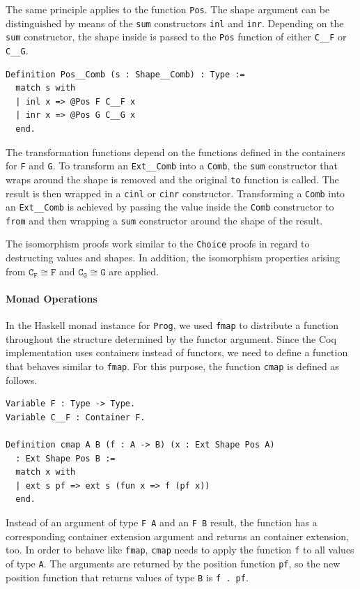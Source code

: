 \documentclass[a4paper, 11pt, fleqn, twoside]{scrreprt}
\newcommand{\hinl}[1]{\texttt{#1}}
\newcommand{\cinl}[1]{\texttt{#1}}
\begin{document}
The same principle applies to the function \cinl{Pos}.
The shape argument can be distinguished by means of the \cinl{sum} constructors \cinl{inl} and \cinl{inr}.
Depending on the \cinl{sum} constructor, the shape inside is passed to the \cinl{Pos} function of either \cinl{C__F} or \cinl{C__G}.

\begin{verbatim}
Definition Pos__Comb (s : Shape__Comb) : Type :=
  match s with
  | inl x => @Pos F C__F x
  | inr x => @Pos G C__G x
  end.
\end{verbatim}

The transformation functions depend on the functions defined in the containers for \cinl{F} and \cinl{G}.
To transform an \cinl{Ext__Comb} into a \cinl{Comb}, the \cinl{sum} constructor that wraps around the shape is removed and the original \cinl{to} function is called.
The result is then wrapped in a \cinl{cinl} or \cinl{cinr} constructor.
Transforming a \cinl{Comb} into an \cinl{Ext__Comb} is achieved by passing the value inside the \hinl{Comb} constructor to \cinl{from} and then wrapping a \cinl{sum} constructor around the shape of the result.

The isomorphism proofs work similar to the \cinl{Choice} proofs in regard to destructing values and shapes.
In addition, the isomorphism properties arising from $\texttt{C}_\texttt{F} \cong \texttt{F}$ and $\texttt{C}_\texttt{G} \cong \texttt{G}$ are applied.

\paragraph{Monad Operations}
In the Haskell monad instance for \hinl{Prog}, we used \hinl{fmap} to distribute a function throughout the structure determined by the functor argument.
Since the Coq implementation uses containers instead of functors, we need to define a function that behaves similar to \hinl{fmap}.
For this purpose, the function \cinl{cmap} is defined as follows.

\begin{verbatim}
Variable F : Type -> Type.
Variable C__F : Container F.

Definition cmap A B (f : A -> B) (x : Ext Shape Pos A) 
  : Ext Shape Pos B :=
  match x with
  | ext s pf => ext s (fun x => f (pf x))
  end.
\end{verbatim}

Instead of an argument of type \cinl{F A} and an \cinl{F B} result, the function has a corresponding container extension argument and returns an container extension, too.
In order to behave like \hinl{fmap}, \cinl{cmap} needs to apply the function \cinl{f} to all values of type \cinl{A}.
The arguments are returned by the position function \cinl{pf}, so the new position function that returns values of type \cinl{B} is \cinl{f . pf}.
\end{document}
